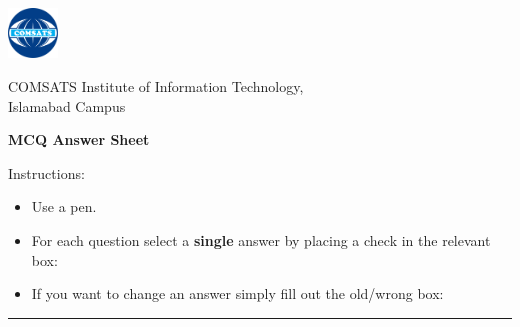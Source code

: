 \documentclass[english,a4paper,oneside]{sdaps}
\author{}
\title{}
\begin{document}

    \hspace{7em}\includegraphics[width=0.1\textwidth]{comsats-logo}         %
    \vspace{-5\baselineskip}                                    %

    \begin{center}
           {COMSATS Institute of Information Technology,\\
           Islamabad Campus}

           \vspace{\baselineskip}
           {\LARGE \bfseries MCQ Answer Sheet}\\

    \end{center}

    Instructions:

        \vspace{.5\baselineskip}
        \hspace{0.025\linewidth}\begin{minipage}{0.9\linewidth}%
            \begin{itemize}
                \item Use a pen.
                \item For each question select a \textbf{single} answer by placing a check in the relevant box: \hspace{1em}\checkedbox
                \item If you want to change an answer simply fill out the old/wrong box: \hspace{1em}\correctedbox
            \end{itemize}
        \end{minipage}
        \vspace{.5\baselineskip}

    \begin{center}\rule{0.8\linewidth}{0.5pt}\end{center}
    \vspace{\baselineskip}

    
    \begin{questionnaire}[noinfo]       %

    \end{questionnaire}
\end{document}
